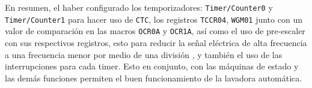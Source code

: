 En resumen, el haber configurado los temporizadores: \texttt{Timer/Counter0} y \texttt{Timer/Counter1} para hacer uso de \texttt{CTC}, los registros \texttt{TCCR04}, \texttt{WGM01} junto con un valor de comparación en las macros \texttt{OCR0A} y \texttt{OCR1A}, así como el uso de pre-escaler con sus respectivos registros, esto para reducir la señal eléctrica de alta frecuencia a una frecuencia menor por medio de una división \cite{web}, y también el uso de las interrupciones para cada timer. Esto en conjunto, con las máquinas de estado y las demás funciones permiten el buen funcionamiento de la lavadora automática.



